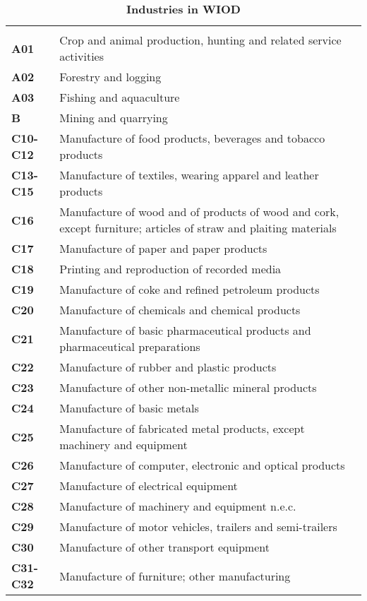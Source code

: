 \documentclass[11pt,a4paper]{article}
\begin{document}
\begin{table}[!h]
 \centering
 \caption{\footnotesize{\textbf{Industries in WIOD}}}
 \footnotesize
 \begin{tabular}{ll}
  \hline \\
\textbf{A01} &{Crop and animal production, hunting and related service activities}\\
\textbf{A02} &{Forestry and logging}\\
\textbf{A03} &{Fishing and aquaculture}\\
\textbf{B} &{Mining and quarrying}\\
\textbf{C10-C12} &{Manufacture of food products, beverages and tobacco products}\\
\textbf{C13-C15} &{Manufacture of textiles, wearing apparel and leather products}\\
\textbf{C16} &{Manufacture of wood and of products of wood and cork, except furniture; articles of straw and plaiting materials}\\
\textbf{C17} &{Manufacture of paper and paper products}\\
\textbf{C18} &{Printing and reproduction of recorded media}\\
\textbf{C19} &{Manufacture of coke and refined petroleum products}\\
\textbf{C20} &{Manufacture of chemicals and chemical products}\\
\textbf{C21} &{Manufacture of basic pharmaceutical products and pharmaceutical preparations}\\
\textbf{C22} &{Manufacture of rubber and plastic products}\\
\textbf{C23} &{Manufacture of other non-metallic mineral products}\\
\textbf{C24} &{Manufacture of basic metals}\\
\textbf{C25} &{Manufacture of fabricated metal products, except machinery and equipment}\\
\textbf{C26} &{Manufacture of computer, electronic and optical products}\\
\textbf{C27} &{Manufacture of electrical equipment}\\
\textbf{C28} &{Manufacture of machinery and equipment n.e.c.}\\
\textbf{C29} &{Manufacture of motor vehicles, trailers and semi-trailers}\\
\textbf{C30} &{Manufacture of other transport equipment}\\
\textbf{C31-C32} &{Manufacture of furniture; other manufacturing}\\

\end{tabular}
\end{table}
\end{document}
